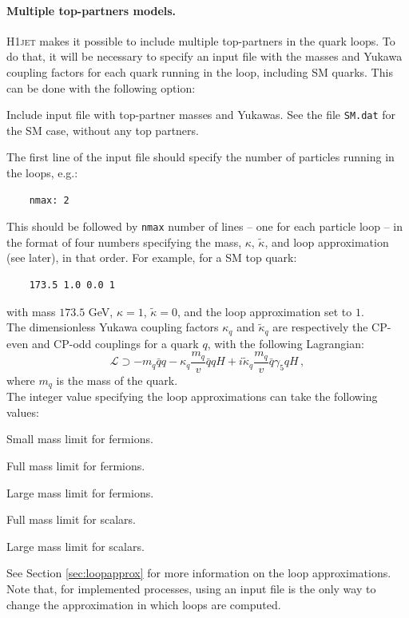 \documentclass[12pt]{article}
\begin{document}
\paragraph{Multiple top-partners models.}
\textsc{H1jet} makes it possible to include multiple top-partners in
the quark loops. To do that, it will be necessary to specify an input
file with the masses and Yukawa coupling factors for each quark
running in the loop, including SM quarks. This can be done with the
following option:
\begin{description}[labelindent=1cm, labelwidth =\widthof{\bfseries9999999999999999999999}, leftmargin = !] 
\item[\texttt{-i, --in <file>}] Include input file with top-partner
  masses and Yukawas. See the file \texttt{SM.dat} for the SM case,
  without any top partners.
\end{description} 
The first line of the input file should specify the number of
particles running in the loops, e.g.:
\begin{lstlisting}
	nmax: 2 
\end{lstlisting}
This should be followed by \texttt{nmax} number of lines -- one for each particle loop -- in the format of four numbers specifying the mass, $\kappa$, $\tilde{\kappa}$, and loop approximation (see later), in that order. For example, for a SM top quark: 
\begin{lstlisting}
	173.5 1.0 0.0 1 
\end{lstlisting}
with mass $173.5$ GeV, $\kappa = 1$, $\tilde{\kappa} = 0$, and the loop approximation set to $1$. \\ 

The dimensionless Yukawa coupling factors $\kappa_q$ and $\tilde{\kappa}_q$ are respectively the CP-even and CP-odd couplings for a quark $q$, with the following Lagrangian: 
\begin{equation}
	\mathcal{L} \supset -m_q \bar{q}q - \kappa_q \frac{m_q}{v} \bar{q}q H + i \tilde{\kappa}_q \frac{m_q}{v} \bar{q} \gamma_5 q H \,,
\end{equation}
where $m_q$ is the mass of the quark. \\ 

The integer value specifying the loop approximations can take the following values: 
\begin{description}[labelindent=1cm, labelwidth =\widthof{\bfseries9999}, leftmargin = !] 
	\item[$0$] Small mass limit for fermions. 
	\item[$1$] Full mass limit for fermions. 
	\item[$2$] Large mass limit for fermions. 
	\item[$3$] Full mass limit for scalars. 
	\item[$4$] Large mass limit for scalars. 
\end{description}
See Section \ref{sec:loopapprox} for more information on the loop
approximations. Note that, for implemented processes, using an input
file is the only way to change the approximation in which loops are
computed.
\end{document}
